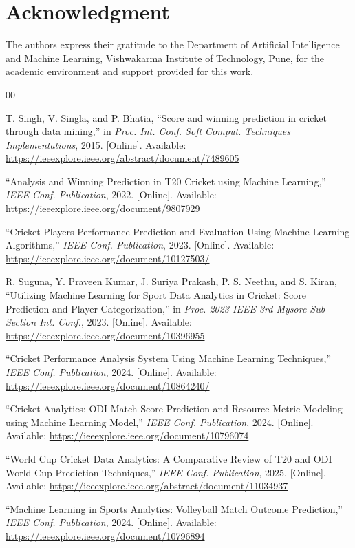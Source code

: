 \documentclass[conference]{IEEEtran}
\begin{document}
\section*{Acknowledgment}
The authors express their gratitude to the Department of Artificial Intelligence and Machine Learning, Vishwakarma Institute of Technology, Pune, for the academic environment and support provided for this work.

\begin{thebibliography}{00}

T. Singh, V. Singla, and P. Bhatia, ``Score and winning prediction in cricket through data mining,'' in \textit{Proc. Int. Conf. Soft Comput. Techniques Implementations}, 2015. [Online]. Available: \url{https://ieeexplore.ieee.org/abstract/document/7489605}

``Analysis and Winning Prediction in T20 Cricket using Machine Learning,'' \textit{IEEE Conf. Publication}, 2022. [Online]. Available: \url{https://ieeexplore.ieee.org/document/9807929}

``Cricket Players Performance Prediction and Evaluation Using Machine Learning Algorithms,'' \textit{IEEE Conf. Publication}, 2023. [Online]. Available: \url{https://ieeexplore.ieee.org/document/10127503/}

R. Suguna, Y. Praveen Kumar, J. Suriya Prakash, P. S. Neethu, and S. Kiran, ``Utilizing Machine Learning for Sport Data Analytics in Cricket: Score Prediction and Player Categorization,'' in \textit{Proc. 2023 IEEE 3rd Mysore Sub Section Int. Conf.}, 2023. [Online]. Available: \url{https://ieeexplore.ieee.org/document/10396955}

``Cricket Performance Analysis System Using Machine Learning Techniques,'' \textit{IEEE Conf. Publication}, 2024. [Online]. Available: \url{https://ieeexplore.ieee.org/document/10864240/}

``Cricket Analytics: ODI Match Score Prediction and Resource Metric Modeling using Machine Learning Model,'' \textit{IEEE Conf. Publication}, 2024. [Online]. Available: \url{https://ieeexplore.ieee.org/document/10796074}

``World Cup Cricket Data Analytics: A Comparative Review of T20 and ODI World Cup Prediction Techniques,'' \textit{IEEE Conf. Publication}, 2025. [Online]. Available: \url{https://ieeexplore.ieee.org/abstract/document/11034937}

``Machine Learning in Sports Analytics: Volleyball Match Outcome Prediction,'' \textit{IEEE Conf. Publication}, 2024. [Online]. Available: \url{https://ieeexplore.ieee.org/document/10796894}


\end{thebibliography}
\end{document}
